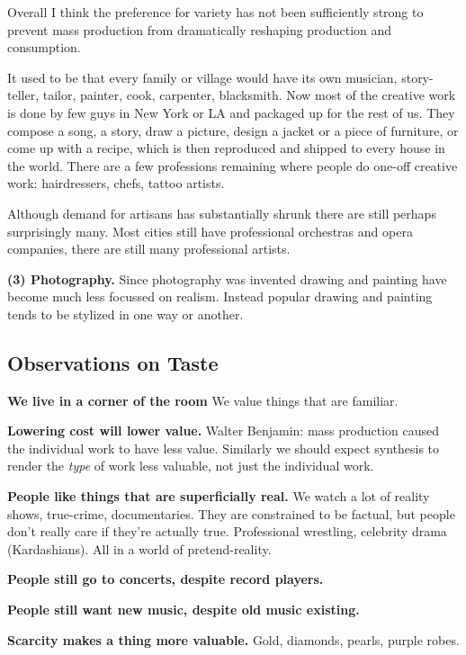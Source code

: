 \documentclass[
  11pt,
  letterpaper,
  DIV=11,
  numbers=noendperiod,
  oneside]{scrartcl}
\begin{document}
Overall I think the preference for variety has not been sufficiently
strong to prevent mass production from dramatically reshaping production
and consumption.

It used to be that every family or village would have its own musician,
story-teller, tailor, painter, cook, carpenter, blacksmith. Now most of
the creative work is done by few guys in New York or LA and packaged up
for the rest of us. They compose a song, a story, draw a picture, design
a jacket or a piece of furniture, or come up with a recipe, which is
then reproduced and shipped to every house in the world. There are a few
professions remaining where people do one-off creative work:
hairdressers, chefs, tattoo artists.

Although demand for artisans has substantially shrunk there are still
perhaps surprisingly many. Most cities still have professional
orchestras and opera companies, there are still many professional
artists.

\textbf{(3) Photography.} Since photography was invented drawing and
painting have become much less focussed on realism. Instead popular
drawing and painting tends to be stylized in one way or another.

\hypertarget{observations-on-taste}{%
\subsection{Observations on Taste}\label{observations-on-taste}}

\textbf{We live in a corner of the room} We value things that are
familiar.

\textbf{Lowering cost will lower value.} Walter Benjamin: mass
production caused the individual work to have less value. Similarly we
should expect synthesis to render the \emph{type} of work less valuable,
not just the individual work.

\textbf{People like things that are superficially real.} We watch a lot
of reality shows, true-crime, documentaries. They are constrained to be
factual, but people don't really care if they're actually true.
Professional wrestling, celebrity drama (Kardashians). All in a world of
pretend-reality.

\textbf{People still go to concerts, despite record players.}

\textbf{People still want new music, despite old music existing.}

\textbf{Scarcity makes a thing more valuable.} Gold, diamonds, pearls,
purple robes.
\end{document}
